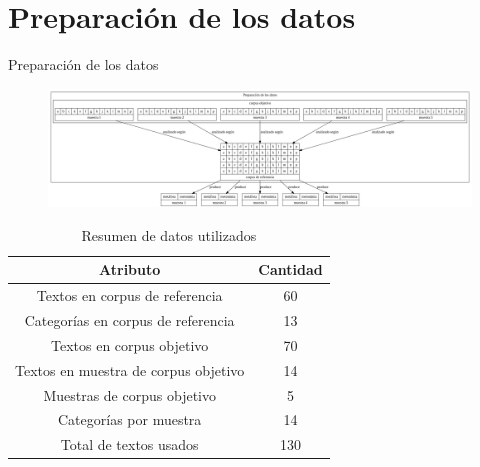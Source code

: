 \documentclass[presentation]{beamer}
\begin{document}
\section{Preparación de los datos}
\label{sec:org220b5b7}
\begin{frame}[label={sec:org621fc41}]{Preparación de los datos}
\begin{figure}
\includegraphics[width=\textwidth]{./assets/preparacion_visualizacion.png}
\end{figure}


     \begin{table}[!ht]
    \centering

    \begin{tabular}{|c|c|}
    \hline
      Atributo & Cantidad \\ \hline
      Textos en corpus de referencia & 60 \\ \hline
      Categorías en corpus de referencia  & 13 \\ \hline
     Textos en corpus objetivo & 70 \\ \hline
     Textos en muestra de corpus objetivo & 14 \\ \hline
     Muestras de corpus objetivo & 5 \\ \hline
     Categorías por muestra & 14  \\ \hline
     Total de textos usados & 130  \\ \hline
    \end{tabular}
\caption{Resumen de datos utilizados}
\label{tab:resumen_preparacion}
\end{table}
\end{frame}
\end{document}

